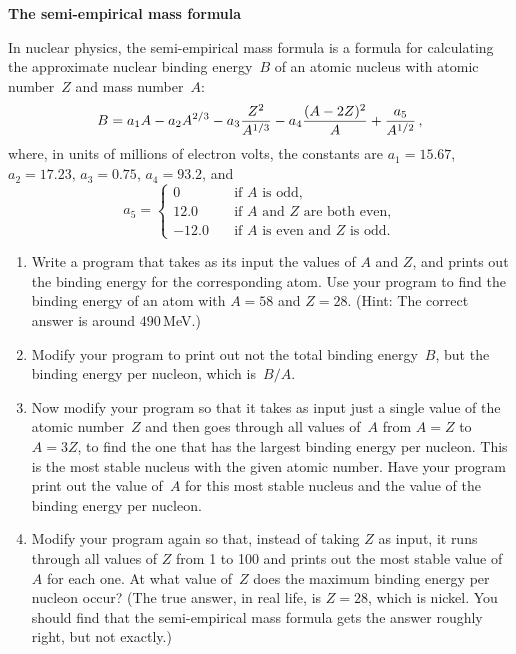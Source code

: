 \documentclass[12pt]{article}
\begin{document}
\begin{exercises}

\exercise \textbf{The semi-empirical mass formula}

\exskip In nuclear physics, the semi-empirical mass formula is a formula
for calculating the approximate nuclear binding energy~$B$ of an atomic
nucleus with atomic number~$Z$ and mass number~$A$:
\begin{displaymath}
B = a_1 A - a_2 A^{2/3} - a_3 {Z^2\over A^{1/3}}
    - a_4 {(A - 2Z)^2\over A} + {a_5\over A^{1/2}}\,,
\end{displaymath}
where, in units of millions of electron volts, the constants are
$a_1=15.67$, $a_2=17.23$, $a_3=0.75$, $a_4=93.2$, and
\begin{displaymath}
a_5 = \left\lbrace\begin{array}{ll}
      0     &\quad\mbox{if $A$ is odd,} \\
      12.0  &\quad\mbox{if $A$ and $Z$ are both even,} \\
      -12.0 &\quad\mbox{if $A$ is even and $Z$ is odd.}
      \end{array}\right.
\end{displaymath}
\begin{enumerate}\setlength{\itemsep}{0pt}
\item Write a program that takes as its input the values of $A$ and $Z$,
  and prints out the binding energy for the corresponding atom.  Use your
  program to find the binding energy of an atom with $A=58$ and $Z=28$.
  (Hint: The correct answer is around $490\,$MeV.)
\item Modify your program to print out not the total binding energy~$B$,
  but the binding energy per nucleon, which is~$B/A$.
\item Now modify your program so that it takes as input just a single value
  of the atomic number~$Z$ and then goes through all values of~$A$ from
  $A=Z$ to $A=3Z$, to find the one that has the largest binding energy per
  nucleon.  This is the most stable nucleus with the given atomic number.
  Have your program print out the value of~$A$ for this most stable nucleus
  and the value of the binding energy per nucleon.
\item Modify your program again so that, instead of taking $Z$ as input, it
  runs through all values of $Z$ from 1 to 100 and prints out the most
  stable value of $A$ for each one.  At what value of~$Z$ does the maximum
  binding energy per nucleon occur?  (The true answer, in real life, is
  $Z=28$, which is nickel.  You should find that the semi-empirical mass
  formula gets the answer roughly right, but not exactly.)
\end{enumerate}



\end{exercises}
\end{document}
